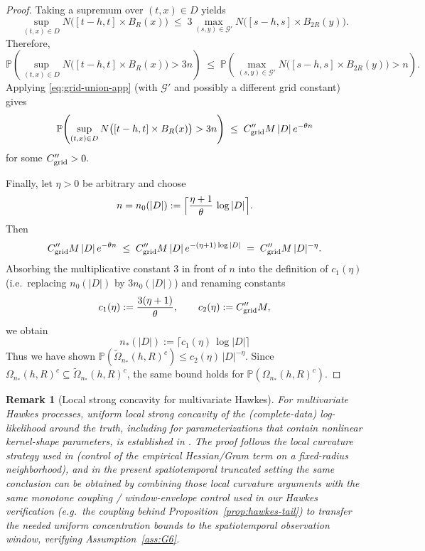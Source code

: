 \documentclass{statsoc}
\newtheorem{remark}[remark]{Remark}
\newcommand{\bbP}{\mathbb{P}}
\newcommand{\1}{\mathbbm{1}}
\begin{document}
\begin{proof}
Taking a supremum over $(t,x)\in D$ yields
\[
  \sup_{(t,x)\in D} N\bigl([t-h,t]\times B_R(x)\bigr)
  \;\le\; 3\max_{(s,y)\in\mathcal G'} N\bigl([s-h,s]\times B_{2R}(y)\bigr).
\]
Therefore,
\[
  \bbP\!\left(
    \sup_{(t,x)\in D} N\bigl([t-h,t]\times B_R(x)\bigr) > 3n
  \right)
  \;\le\;
  \bbP\!\left(
    \max_{(s,y)\in\mathcal G'} N\bigl([s-h,s]\times B_{2R}(y)\bigr) > n
  \right).
\]
Applying \eqref{eq:grid-union-app} (with $\mathcal G'$ and possibly a different grid constant) gives
\[
  \bbP\!\left(
    \sup_{(t,x)\in D} N\bigl([t-h,t]\times B_R(x)\bigr) > 3n
  \right)
  \;\le\; C''_{\rm grid} M\,|D|\,e^{-\theta n}
\]
for some $C''_{\rm grid}>0$.

Finally, let $\eta>0$ be arbitrary and choose
\[
  n = n_0(|D|)
  := \Bigl\lceil \frac{\eta+1}{\theta}\,\log|D| \Bigr\rceil.
\]
Then
\[
  C''_{\rm grid}M\,|D|\,e^{-\theta n}
  \;\le\; C''_{\rm grid}M\,|D|\,e^{-(\eta+1)\log|D|}
  \;=\; C''_{\rm grid}M\,|D|^{-\eta}.
\]
Absorbing the multiplicative constant $3$ in front of $n$ into the definition of $c_1(\eta)$ (i.e.\ replacing $n_0(|D|)$ by $3n_0(|D|)$) and renaming constants
\[
  c_1(\eta):=\frac{3(\eta+1)}{\theta},
  \qquad
  c_2(\eta):=C''_{\rm grid}M,
\]
we obtain
\[
  n_*(|D|)
  := \bigl\lceil c_1(\eta)\,\log|D| \bigr\rceil
\]
Thus we have shown \(\bbP(\widetilde\Omega_{n_*}(h,R)^c)\le c_2(\eta)\,|D|^{-\eta}\). Since \(\Omega_{n_*}(h,R)^c\subseteq \widetilde\Omega_{n_*}(h,R)^c\), the same bound holds for \(\bbP(\Omega_{n_*}(h,R)^c)\).
\end{proof}

\begin{remark}[Local strong concavity for multivariate Hawkes]\label{rem:hawkes-local-sc}
For multivariate Hawkes processes, uniform local strong concavity of the (complete-data) log-likelihood around the truth, including for parameterizations that contain nonlinear kernel-shape parameters, is established in \citet{DAVISKRESIN_HPB}. The proof follows the local curvature strategy used in \citet{hansen2015lasso} (control of the empirical Hessian/Gram term on a fixed-radius neighborhood), and in the present spatiotemporal truncated setting the same conclusion can be obtained by combining those local curvature arguments with the same monotone coupling / window-envelope control used in our Hawkes verification (e.g.\ the coupling behind Proposition~\ref{prop:hawkes-tail}) to transfer the needed uniform concentration bounds to the spatiotemporal observation window, verifying Assumption~\ref{ass:G6}.
\end{remark}
\end{document}
